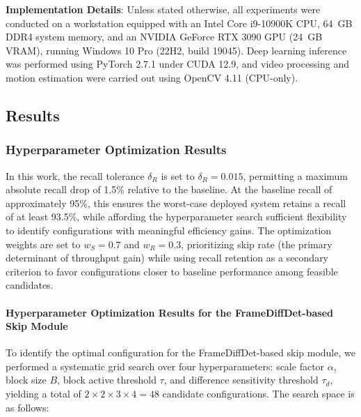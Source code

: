 \documentclass[final,3p,times,twocolumn]{elsarticle}
\begin{document}
\textbf{Implementation Details}: Unless stated otherwise, all
experiments were conducted on a workstation equipped with an Intel Core
i9-10900K CPU, 64~GB DDR4 system memory, and an NVIDIA GeForce RTX 3090
GPU (24~GB VRAM), running Windows 10 Pro (22H2, build 19045). Deep
learning inference was performed using PyTorch 2.7.1 under CUDA 12.9,
and video processing and motion estimation were carried out using
OpenCV 4.11 (CPU-only).

\subsection{Results}\label{results}

\subsubsection{Hyperparameter Optimization Results}\label{hyperparameter-optimization-results}

In this work, the recall tolerance $\delta_R$ is set to
$\delta_R = 0.015$, permitting a maximum absolute recall drop of 1.5\%
relative to the baseline. At the baseline recall of approximately 95\%,
this ensures the worst-case deployed system retains a recall of at
least 93.5\%, while affording the hyperparameter search sufficient
flexibility to identify configurations with meaningful efficiency
gains. The optimization weights are set to $w_S = 0.7$ and $w_R = 0.3$,
prioritizing skip rate (the primary determinant of throughput gain)
while using recall retention as a secondary criterion to favor
configurations closer to baseline performance among feasible
candidates.

\paragraph{Hyperparameter Optimization Results for the FrameDiffDet-based
Skip Module}\label{sec:frameDiffResults}

To identify the optimal configuration for the FrameDiffDet-based skip
module, we performed a systematic grid search over four
hyperparameters: scale factor $\alpha$, block size $B$, block active
threshold $\tau$, and difference sensitivity threshold $\tau_d$,
yielding a total of $2 \times 2 \times 3 \times 4 = 48$ candidate
configurations. The search space is as follows:
\end{document}

